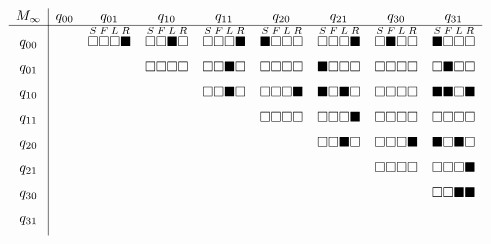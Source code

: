 \hspace{-0.18cm} \[
  \begin{array}{c|cccccccc}
    M_\infty & q_{00} & q_{01} & q_{10} & q_{11} & q_{20} & q_{21} & q_{30} & q_{31} \\ \hline
    q_{00}       &        &
    \overset{S}{\square}\overset{F}{\square}\overset{L}{\square}\overset{R}{\blacksquare} &
    \overset{S}{\square}\overset{F}{\square}\overset{L}{\blacksquare}\overset{R}{\square} &
    \overset{S}{\square}\overset{F}{\square}\overset{L}{\square}\overset{R}{\blacksquare} &
    \overset{S}{\blacksquare}\overset{F}{\square}\overset{L}{\square}\overset{R}{\square} &
    \overset{S}{\square}\overset{F}{\square}\overset{L}{\square}\overset{R}{\blacksquare} &
    \overset{S}{\square}\overset{F}{\blacksquare}\overset{L}{\square}\overset{R}{\square} &
    \overset{S}{\blacksquare}\overset{F}{\square}\overset{L}{\square}\overset{R}{\square} \\ [6pt]
    q_{01}       &        &              & \square\square\square\square & \square\square\blacksquare\square & \square\square\square\square & \blacksquare\square\square\square & \square\square\square\square & \square\blacksquare\square\square \\ [6pt]
    q_{10}       &        &              &              & \square\square\blacksquare\square & \square\square\square\blacksquare & \blacksquare\square\blacksquare\square & \square\square\square\square & \blacksquare\blacksquare\square\blacksquare \\ [6pt]
    q_{11}       &        &              &              &              & \square\square\square\square & \square\square\square\blacksquare & \square\square\square\square & \square\square\square\square \\ [6pt]
    q_{20}       &        &              &              &              &              & \square\square\blacksquare\square & \square\square\square\blacksquare & \blacksquare\square\blacksquare\square \\ [6pt]
    q_{21}       &        &              &              &              &              &              & \square\square\square\square & \square\square\square\blacksquare \\ [6pt]
    q_{30}       &        &              &              &              &              &              &              & \square\square\blacksquare\blacksquare \\ [6pt]
    q_{31}       &        &              &              &              &              &              &              &              \\ [6pt]
  \end{array}
\]